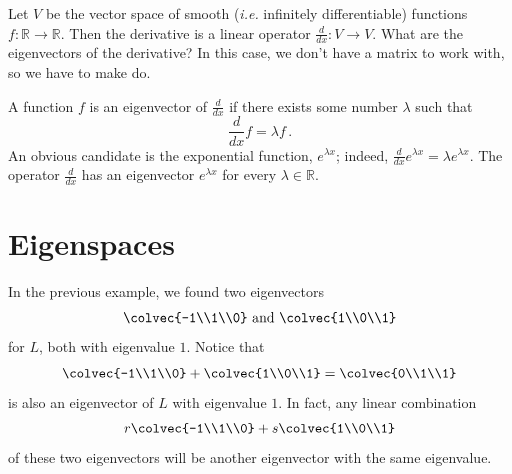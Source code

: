 \begin{example}
Let $V$ be the vector space of smooth (\textit{i.e.} infinitely differentiable) functions $f \colon \mathbb{R}\rightarrow \mathbb{R}$.  Then the derivative is a linear operator $\frac{d}{dx} \colon V\rightarrow V$.  What are the eigenvectors of the derivative?  In this case, we don't have a matrix to work with, so we have to make do.

A function $f$ is an eigenvector of $\frac{d}{dx}$ if there exists some number $\lambda$ such that \[\frac{d}{dx}f=\lambda f\, .\]  An obvious candidate is the exponential function, $e^{\lambda x}$; indeed, $\frac{d}{dx} e^{\lambda x} = \lambda e^{\lambda x}$.
The operator $\frac{d}{dx}$ has an eigenvector $e^{\lambda x}$ for every $\lambda \in \mathbb{R}$.
\end{example}


\section{Eigenspaces}
In the previous example, we found two eigenvectors  \[\colvec{-1\\1\\0} \mbox{ and }\colvec{1\\0\\1}\] for $L$, both with eigenvalue $1$.  Notice that  \[\colvec{-1\\1\\0} + \colvec{1\\0\\1}=
\colvec{0\\1\\1}\] is also an eigenvector of $L$ with eigenvalue $1$.  In fact, any linear combination \[r\colvec{-1\\1\\0} + s\colvec{1\\0\\1}\] of these two eigenvectors will be another eigenvector with the same eigenvalue.  

